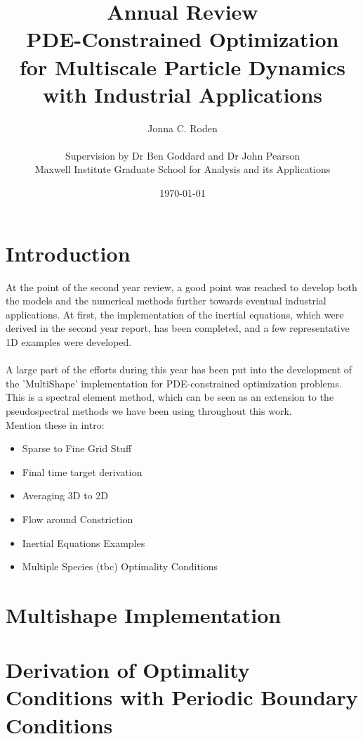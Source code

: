 \documentclass[11pt, a4paper]{article}
\title{{\huge Annual Review \\ PDE-Constrained Optimization \\for Multiscale Particle Dynamics} \\ with Industrial Applications}
\author{Jonna C. Roden\\ \\Supervision by Dr Ben Goddard and Dr John Pearson\\ \vspace{0.5cm} Maxwell Institute Graduate School for Analysis and its Applications}
\date{\today}
\theoremstyle{definition}
\begin{document}
	\maketitle
	
	\newpage
	\tableofcontents
	\newpage
	
	\section{Introduction}
	At the point of the second year review, a good point was reached to develop both the models and the numerical methods further towards eventual industrial applications. 
	At first, the implementation of the inertial equations, which were derived in the second year report, has been completed, and a few representative 1D examples were developed.\\
	\\
	A large part of the efforts during this year has been put into the development of the 'MultiShape' implementation for PDE-constrained optimization problems. This is a spectral element method, which can be seen as an extension to the pseudospectral methods we have been using throughout this work.\\
	Mention these in intro:
	\begin{itemize}
	\item Sparse to Fine Grid Stuff
	\item Final time target derivation
	\item Averaging 3D to 2D
	\item Flow around Constriction
	\item Inertial Equations Examples
	\item Multiple Species (tbc) Optimality Conditions
	\end{itemize}
	
	\section{Multishape Implementation}
		
	
	
	\section{Derivation of Optimality Conditions with Periodic Boundary Conditions}
	
\end{document}
